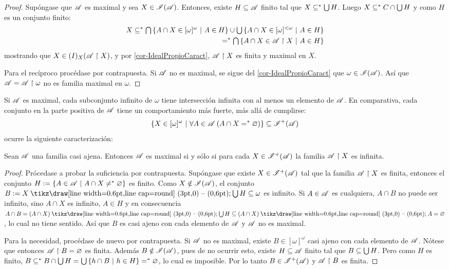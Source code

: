  \begin{proof}
  Supóngase que $\mathscr{A}$ es maximal y sea $X \in \mathscr{I}(\mathscr{A})$. Entonces, existe $H \subseteq \mathscr{A}$ finito tal que $X \subseteq^* \mbox{$\bigcup$}\, H$. Luego $X \subseteq^* C \cap \mbox{$\bigcup$}\, H$ y como $H$ es un conjunto finito:
  \begin{align*}
   X \subseteq^* \mbox{$\bigcap$}\,\{ A \cap X \in [\omega]^\omega \text{ $|$ } A \in H \} \cup \mbox{$\bigcup$}\,\{ A \cap X \in [\omega]^{<\omega} \text{ $|$ } A \in H \} \\
   =^* \mbox{$\bigcap$}\,\{ A \cap X \in \mathscr{A} \upharpoonright X \text{ $|$ } A \in H \}
  \end{align*}
  mostrando que $X \in \mathscr{(}I)_X(\mathscr{A}\upharpoonright X)$, y por \ref{cor-IdealPropioCaract}, $\mathscr{A} \upharpoonright X$ es finita y maximal en $X$.

  Para el recíproco procédase por contrapuesta. Si $\mathscr{A}$ no es maximal, se sigue del \autoref{cor-IdealPropioCaract} que $\omega \in \mathscr{I}(\mathscr{A})$. Así que $\mathscr{A} = \mathscr{A} \upharpoonright \omega$ no es familia maximal en $\omega$.
 \end{proof}

 Si $\mathscr{A}$ es maximal, cada subconjunto infinito de $\omega$ tiene intersección infinita con al menos un elemento de $\mathscr{A}$. En comparativa, cada conjunto en la parte positiva de $\mathscr{A}$ tiene un comportamiento más fuerte, más allá de cumplirse:
 \[ \{X \in [\omega]^{\omega} \text{ $|$ } \forall A \in \mathscr{A} \: (A \cap X =^* \varnothing) \} \subseteq \mathscr{I}^+(\mathscr{A}) \]
 ocurre la siguiente caracterización:

 \begin{proposicion}\label{prop-CaracMADPositiv}
  Sean $\mathscr{A}$ una familia casi ajena. Entonces $\mathscr{A}$ es maximal si y sólo si para cada $X \in \mathscr{I}^+(\mathscr{A})$ la familia $\mathscr{A} \upharpoonright X$ es infinita.
 \end{proposicion}

 \begin{proof}
  Prócedase a probar la suficiencia por contrapuesta. Supóngase que existe $X \in \mathscr{I}^+(\mathscr{A})$ tal que la familia $\mathscr{A} \upharpoonright X$ es finita, entonces el conjunto $H:=\{ A \in \mathscr{A} \text{ $|$ } A \cap X \neq^* \varnothing \}$ es finito. Como $X \notin \mathscr{I}(\mathscr{A})$, el conjunto $B:=X \setminus \midcup H \subseteq \omega$ es infinito. Si $A \in \mathscr{A}$ es cualquiera, $A \cap B$ no puede ser infinito, sino $A \cap X$ es infinito, $A \in H$ y en consecuencia $A \cap B = (A \cap X) \setminus \midcup H \subseteq (A \cap X) \setminus A = \emptyset$, lo cual no tiene sentido. Así que $B$ es casi ajeno con cada elemento de $\mathscr{A}$ y $\mathscr{A}$ no es maximal.

  Para la necesidad, procédase de nuevo por contrapuesta. Si $\mathscr{A}$ no es maximal, existe $B \in [\omega]^\omega$ casi ajeno con cada elemento de $\mathscr{A}$. Nótese que entonces $\mathscr{A} \upharpoonright B = \varnothing$ es finita. Además $B \notin \mathscr{I}(\mathscr{A})$, pues de no ocurrir esto, existe $H \subseteq \mathscr{A}$ finito tal que $B \subseteq \mbox{$\bigcup$}\, H$. Pero como $H$ es finito, $B \subseteq^* B \cap \mbox{$\bigcup$}\, H = \mbox{$\bigcup$}\, \{ h \cap B \text{ $|$ } h \in H \} =^* \varnothing$, lo cual es imposible. Por lo tanto $B \in \mathscr{I}^+(\mathscr{A})$ y $\mathscr{A} \upharpoonright B$ es finita.
 \end{proof}

